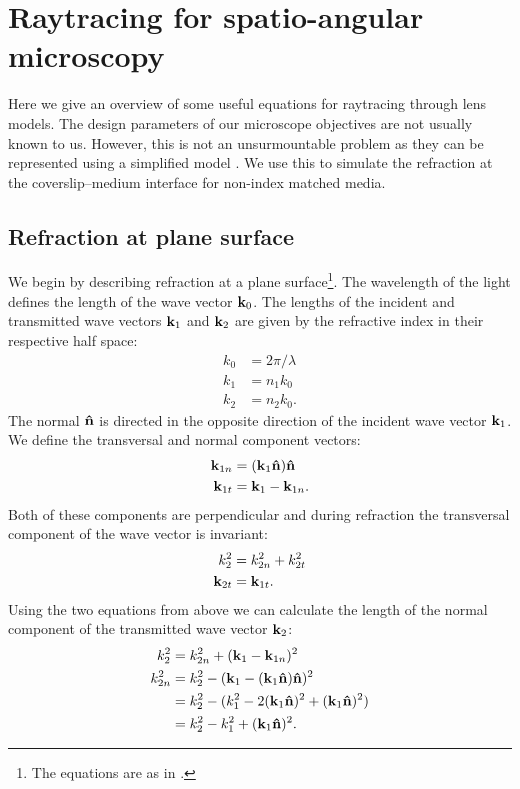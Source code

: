 \chapter{Raytracing for spatio-angular microscopy}
\label{sec:raytrace}
\renewcommand{\i}{\nvect i}

Here we give an overview of some useful equations for raytracing
through lens models. The design parameters of our microscope
objectives are not usually known to us. However, this is not an
unsurmountable problem as they can be represented using a simplified
model \citep{Hwang2008}. We use this to simulate the refraction at the
coverslip--medium interface for non-index matched media.

\section{Refraction at plane surface}
We begin by describing refraction at a plane surface\footnote{The
  equations are as in \citep{McClain1993}.}. The wavelength of the
light defines the length of the wave vector $\mathbf{k}_0$. The lengths of the
incident and transmitted wave vectors $\mathbf{k}_1$ and $\mathbf{k}_2$ are given by
the refractive index in their respective half space:
\begin{align}
  k_0&=2\pi/\lambda\\
  k_1&=n_1 k_0\\
  k_2&=n_2 k_0.
\end{align}
The normal $\mathbf{\hat{n}}$ is directed in the opposite direction of the incident
wave vector $\mathbf{k}_1$. We define the transversal and normal component
vectors:
\begin{align}
  \mathbf{k}_{1n}&=(\mathbf{k}_1\mathbf{\hat{n}})\mathbf{\hat{n}}\\ 
  \mathbf{k}_{1t}&=\mathbf{k}_1 - \mathbf{k}_{1n}.
\end{align}
Both of these components are perpendicular and during refraction the
transversal component of the wave vector is invariant:
\begin{align}
  k_2^2&=k_{2n}^2 + k_{2t}^2\\
  \mathbf{k}_{2t}&=\mathbf{k}_{1t}.
\end{align}
Using the two equations from above we can calculate the length of the
normal component of the transmitted wave vector $\mathbf{k}_2$:
\begin{align}
  k_2^2&=k_{2n}^2 + (\mathbf{k}_1 - \mathbf{k}_{1n})^2\\
  k_{2n}^2&=k_2^2-(\mathbf{k}_1-(\mathbf{k}_1\mathbf{\hat{n}})\mathbf{\hat{n}})^2\\
  &= k_2^2-(k_1^2-2(\mathbf{k}_1\mathbf{\hat{n}})^2+(\mathbf{k}_1\mathbf{\hat{n}})^2)\\
  &= k_2^2-k_1^2+(\mathbf{k}_1\mathbf{\hat{n}})^2.
\end{align}

